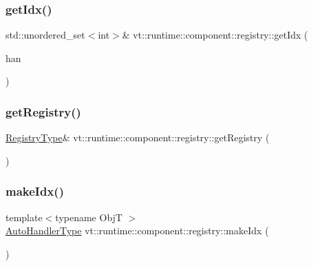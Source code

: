 \subsubsection{\texorpdfstring{get\+Idx()}{getIdx()}}
{\footnotesize\ttfamily std\+::unordered\+\_\+set$<$int$>$\& vt\+::runtime\+::component\+::registry\+::get\+Idx (\begin{DoxyParamCaption}\item[{\hyperlink{namespacevt_1_1runtime_1_1component_1_1registry_a9b86518797c7bb91babf0ca8ee7d06e6}{Auto\+Handler\+Type}}]{han }\end{DoxyParamCaption})\hspace{0.3cm}{\ttfamily [inline]}}

\mbox{\label{namespacevt_1_1runtime_1_1component_1_1registry_a225f039f053d2dd0feff25fec31d4739}} 
\subsubsection{\texorpdfstring{get\+Registry()}{getRegistry()}}
{\footnotesize\ttfamily \hyperlink{namespacevt_1_1runtime_1_1component_1_1registry_a5ea96dad7de653a58de4112fdf83de44}{Registry\+Type}\& vt\+::runtime\+::component\+::registry\+::get\+Registry (\begin{DoxyParamCaption}{ }\end{DoxyParamCaption})\hspace{0.3cm}{\ttfamily [inline]}}

\mbox{\label{namespacevt_1_1runtime_1_1component_1_1registry_afc84ed277c6fcec64cba12fa7477e37c}} 
\subsubsection{\texorpdfstring{make\+Idx()}{makeIdx()}}
{\footnotesize\ttfamily template$<$typename ObjT $>$ \\
\hyperlink{namespacevt_1_1runtime_1_1component_1_1registry_a9b86518797c7bb91babf0ca8ee7d06e6}{Auto\+Handler\+Type} vt\+::runtime\+::component\+::registry\+::make\+Idx (\begin{DoxyParamCaption}{ }\end{DoxyParamCaption})\hspace{0.3cm}{\ttfamily [inline]}}

